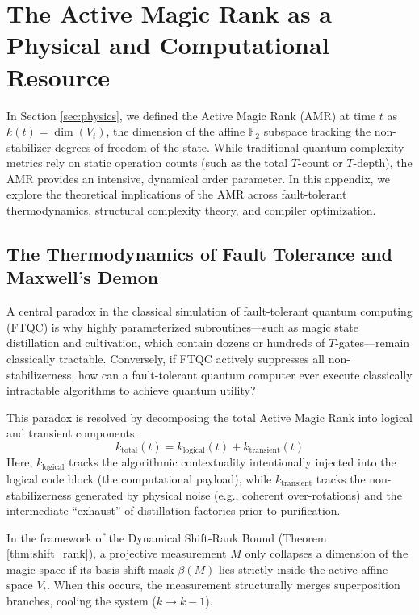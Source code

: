 \documentclass[aps,prx,reprint,superscriptaddress,nofootinbib]{revtex4-2}
\theoremstyle{definition}
\begin{document}
\appendix
\section{The Active Magic Rank as a Physical and Computational Resource}
\label{app:amr}

In Section \ref{sec:physics}, we defined the Active Magic Rank (AMR) at time $t$ as $k(t) = \dim(V_t)$, the dimension of the affine $\mathbb{F}_2$ subspace tracking the non-stabilizer degrees of freedom of the state. While traditional quantum complexity metrics rely on static operation counts (such as the total $T$-count or $T$-depth), the AMR provides an intensive, dynamical order parameter. In this appendix, we explore the theoretical implications of the AMR across fault-tolerant thermodynamics, structural complexity theory, and compiler optimization.

\subsection{The Thermodynamics of Fault Tolerance and Maxwell's Demon}

A central paradox in the classical simulation of fault-tolerant quantum computing (FTQC) is why highly parameterized subroutines—such as magic state distillation and cultivation, which contain dozens or hundreds of $T$-gates—remain classically tractable. Conversely, if FTQC actively suppresses all non-stabilizerness, how can a fault-tolerant quantum computer ever execute classically intractable algorithms to achieve quantum utility?

This paradox is resolved by decomposing the total Active Magic Rank into logical and transient components:
\begin{equation}
    k_{\text{total}}(t) = k_{\text{logical}}(t) + k_{\text{transient}}(t)
\end{equation}
Here, $k_{\text{logical}}$ tracks the algorithmic contextuality intentionally injected into the logical code block (the computational payload), while $k_{\text{transient}}$ tracks the non-stabilizerness generated by physical noise (e.g., coherent over-rotations) and the intermediate ``exhaust'' of distillation factories prior to purification.

In the framework of the Dynamical Shift-Rank Bound (Theorem \ref{thm:shift_rank}), a projective measurement $M$ only collapses a dimension of the magic space if its basis shift mask $\beta(M)$ lies strictly inside the active affine space $V_t$. When this occurs, the measurement structurally merges superposition branches, cooling the system ($k \to k-1$).
\end{document}
